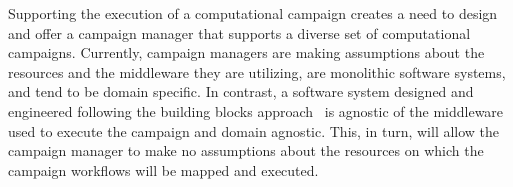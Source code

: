 
%
%

Supporting the execution of a computational campaign creates a need to design and offer a campaign manager that supports a diverse set of computational campaigns.
Currently, campaign managers are making assumptions about the resources and the middleware they are utilizing, are monolithic software systems, and tend to be domain specific.
In contrast, a software system designed and engineered following the building blocks approach~\cite{turilli2019middleware} is agnostic of the middleware used to execute the campaign and domain agnostic.
This, in turn, will allow the campaign manager to make no assumptions about the resources on which the campaign workflows will be mapped and executed.

